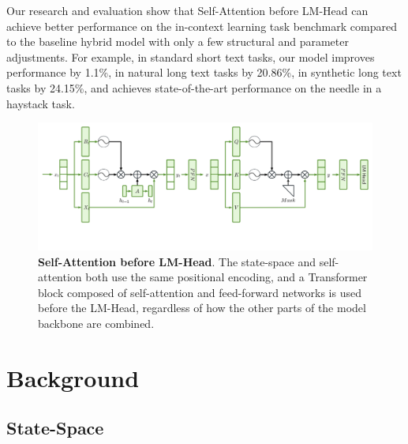\documentclass{article}
\theoremstyle{plain}
\theoremstyle{definition}
\theoremstyle{remark}
\begin{document}
Our research and evaluation show that Self-Attention before LM-Head can achieve better performance on the in-context learning task benchmark compared to the baseline hybrid model with only a few structural and parameter adjustments. For example, in standard short text tasks, our model improves performance by 1.1\%, in natural long text tasks by 20.86\%, in synthetic long text tasks by 24.15\%, and achieves state-of-the-art performance on the needle in a haystack task.

\begin{figure}[ht]
   \centering
   \includegraphics[width=\linewidth]{fig/architecture.pdf}
   \caption{
     \textbf{Self-Attention before LM-Head}.
      The state-space and self-attention both use the same positional encoding, and a Transformer block composed of self-attention and feed-forward networks is used before the LM-Head, regardless of how the other parts of the model backbone are combined.
      }
   \label{fig:architecture}
\end{figure}


\section{Background}

\subsection{State-Space}
\end{document}
